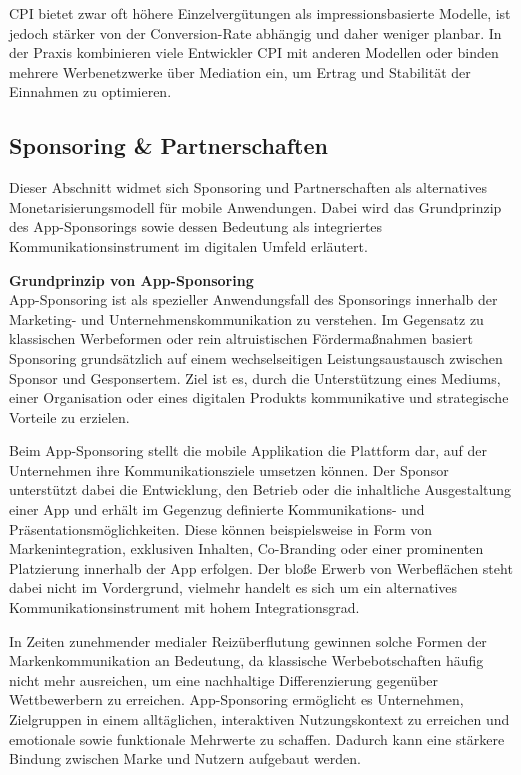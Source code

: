 CPI bietet zwar oft höhere Einzelvergütungen als impressionsbasierte Modelle, ist jedoch stärker von der Conversion-Rate abhängig und daher weniger planbar. In der Praxis kombinieren viele Entwickler CPI mit anderen Modellen oder binden mehrere Werbenetzwerke über Mediation ein, um Ertrag und Stabilität der Einnahmen zu optimieren.\cite{Mobile_add_networks}


\subsection{Sponsoring \& Partnerschaften}
Dieser Abschnitt widmet sich Sponsoring und Partnerschaften als alternatives Monetarisierungsmodell für mobile Anwendungen. Dabei wird das Grundprinzip des App-Sponsorings sowie dessen Bedeutung als integriertes Kommunikationsinstrument im digitalen Umfeld erläutert.

\textbf{Grundprinzip von App-Sponsoring}\\
App-Sponsoring ist als spezieller Anwendungsfall des Sponsorings innerhalb der Marketing- und Unternehmenskommunikation zu verstehen. Im Gegensatz zu klassischen Werbeformen oder rein altruistischen Fördermaßnahmen basiert Sponsoring grundsätzlich auf einem wechselseitigen Leistungsaustausch zwischen Sponsor und Gesponsertem. Ziel ist es, durch die Unterstützung eines Mediums, einer Organisation oder eines digitalen Produkts kommunikative und strategische Vorteile zu erzielen.\cite{sponsoring}

Beim App-Sponsoring stellt die mobile Applikation die Plattform dar, auf der Unternehmen ihre Kommunikationsziele umsetzen können. Der Sponsor unterstützt dabei die Entwicklung, den Betrieb oder die inhaltliche Ausgestaltung einer App und erhält im Gegenzug definierte Kommunikations- und Präsentationsmöglichkeiten. Diese können beispielsweise in Form von Markenintegration, exklusiven Inhalten, Co-Branding oder einer prominenten Platzierung innerhalb der App erfolgen. Der bloße Erwerb von Werbeflächen steht dabei nicht im Vordergrund, vielmehr handelt es sich um ein alternatives Kommunikationsinstrument mit hohem Integrationsgrad.\cite{sponsoring}

In Zeiten zunehmender medialer Reizüberflutung gewinnen solche Formen der Markenkommunikation an Bedeutung, da klassische Werbebotschaften häufig nicht mehr ausreichen, um eine nachhaltige Differenzierung gegenüber Wettbewerbern zu erreichen. App-Sponsoring ermöglicht es Unternehmen, Zielgruppen in einem alltäglichen, interaktiven Nutzungskontext zu erreichen und emotionale sowie funktionale Mehrwerte zu schaffen. Dadurch kann eine stärkere Bindung zwischen Marke und Nutzern aufgebaut werden.\cite{sponsoring}

